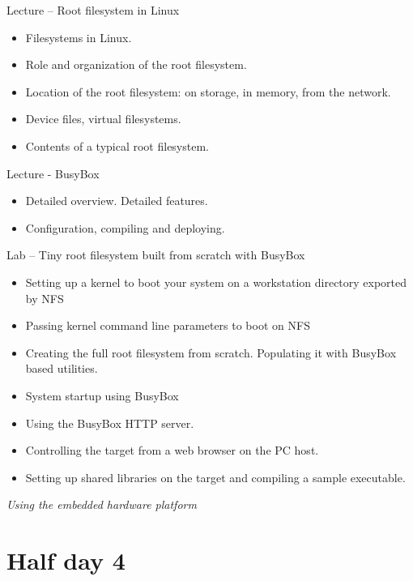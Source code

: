 \documentclass[a4paper,12pt,obeyspaces,spaces,hyphens]{article}
\begin{document}
\feagendatwocolumn
{Lecture – Root filesystem in Linux}
{
  \begin{itemize}
  \item Filesystems in Linux.
  \item Role and organization of the root filesystem.
  \item Location of the root filesystem: on storage, in memory,
        from the network.
  \item Device files, virtual filesystems.
  \item Contents of a typical root filesystem.
  \end{itemize}
}
{Lecture - BusyBox}
{
  \begin{itemize}
  \item Detailed overview. Detailed features.
  \item Configuration, compiling and deploying.
  \end{itemize}
}

\feagendaonecolumn
{Lab – Tiny root filesystem built from scratch with BusyBox}
{
  \begin{itemize}
  \item Setting up a kernel to boot your system on a workstation
    directory exported by NFS
  \item Passing kernel command line parameters to boot on NFS
  \item Creating the full root filesystem from scratch.
    Populating it with BusyBox based utilities.
  \item System startup using BusyBox 
  \item Using the BusyBox HTTP server.
  \item Controlling the target from a web browser on the PC host.
  \item Setting up shared libraries on the target and compiling
    a sample executable.
  \end{itemize}

  \vspace{0.5cm}
  {\em Using the embedded hardware platform}
}

\section{Half day 4}
\end{document}
